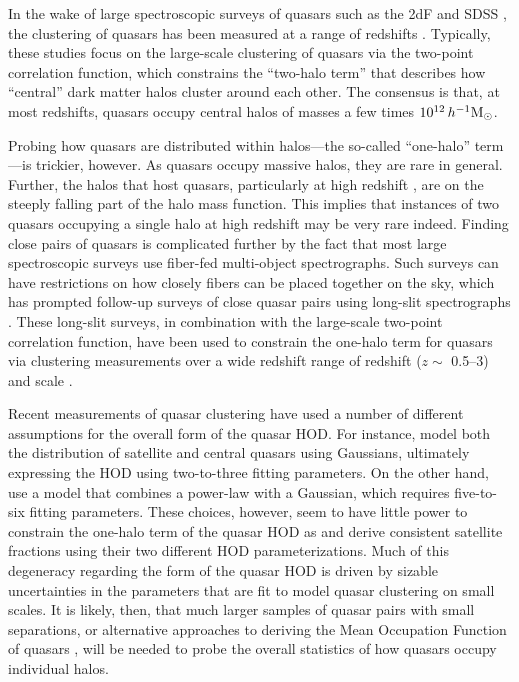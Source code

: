 \documentclass[useAMS,usenatbib]{mn2e}
\begin{document}
In the wake of large spectroscopic surveys of quasars such as the 2dF \citep[][]{2dFsurv} and SDSS 
\citep[e.g.,][]{fu96,gu98,yo00,va01,st02,str02,te04,we04,yi04a,yi04b,bo04,ro05,wi05}, the clustering of quasars has been measured at a range of redshifts
\citep[e.g.,][]{cr04,po04,my06,my07,my07bshe07,she09a,ro09,ric12,wh12,ric13,ro13,ef15,la17}.
Typically, these studies focus on the large-scale clustering of quasars via the two-point correlation function, which 
constrains the ``two-halo term'' that describes how ``central'' dark matter halos cluster around each other. The consensus is that, 
at most redshifts, quasars occupy central halos of masses a few times $10^{12}\,h^{-1} {\rm M_{\odot}}$. 

Probing how quasars are distributed within halos---the so-called ``one-halo'' term---is trickier, however. As 
quasars occupy massive halos, they are rare in general. Further, the halos that host quasars, particularly at 
high redshift \citep[e.g.,][]{wh12,ef15}, are on the steeply falling part of the halo mass function.%
This implies that instances of two quasars occupying a single halo at high redshift may be very rare indeed. 
Finding close pairs of quasars is complicated further by the fact that most large spectroscopic surveys use 
fiber-fed multi-object spectrographs. Such surveys can have restrictions on how closely fibers can be placed 
together on the sky, which has prompted follow-up surveys of close quasar pairs using long-slit spectrographs 
\citep[e.g.,][]{Hen06,my08,Hen10,ko12,ef17}. These long-slit surveys, in combination with the large-scale two-point
correlation function, have been used to constrain the one-halo term for quasars via clustering measurements over 
a wide redshift range of redshift ($z \sim$ 0.5--3) and scale \citep[][]{ric12,ko12,sh13}.

Recent measurements of quasar clustering have used a number of different assumptions for the overall form
of the quasar HOD. For instance, \citet{ko12} model both the distribution of satellite and
central quasars using Gaussians, ultimately expressing the HOD using two-to-three fitting  
parameters. On the other hand, \citet{zh07,ric12,ric13,sh13} use a model that combines a power-law with
a Gaussian, which requires five-to-six fitting parameters. These choices, however, seem to have little
power to constrain the one-halo term of the quasar HOD as \citep{ko12} and \citep{sh13} derive consistent 
satellite fractions using their two different HOD parameterizations. Much of this degeneracy regarding the form of the quasar 
HOD is driven by sizable uncertainties in the parameters that are fit to model quasar clustering on small scales. It is likely, 
then, that much larger samples of quasar pairs with small separations, or alternative approaches to deriving the 
Mean Occupation Function of quasars \citep[e.g][]{Cha13}, will be needed to probe the overall statistics of how
quasars occupy individual halos.
\end{document}

